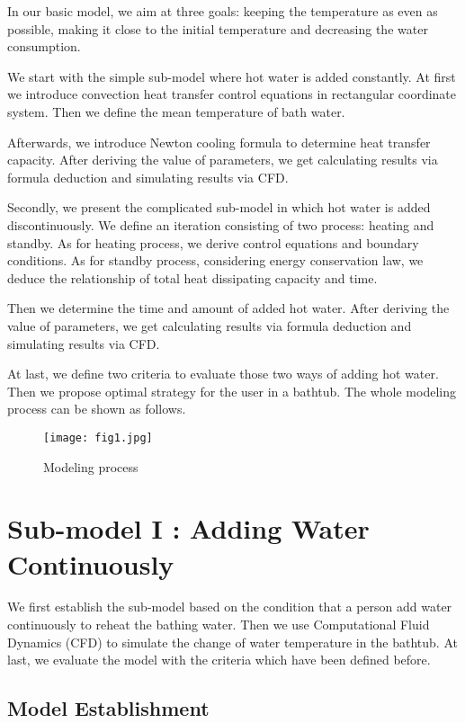 In our basic model, we aim at three goals: keeping the temperature as even as possible, making it close to the initial temperature and decreasing the water consumption.

We start with the simple sub-model where hot water is added constantly.
At first we introduce convection heat transfer control equations in rectangular coordinate system. Then we define the mean temperature of bath water.

Afterwards, we introduce Newton cooling formula to determine heat transfer
capacity. After deriving the value of parameters, we get calculating results via formula deduction and simulating results via CFD.

Secondly, we present the complicated sub-model in which hot water is
added discontinuously. We define an iteration consisting of two process:
heating and standby. As for heating process, we derive control equations and boundary conditions. As for standby process, considering energy conservation law, we deduce the relationship of total heat dissipating capacity and time.

Then we determine the time and amount of added hot water. After deriving the value of parameters, we get calculating results via formula deduction and simulating results via CFD.

At last, we define two criteria to evaluate those two ways of adding hot water. Then we propose optimal strategy for the user in a bathtub.
The whole modeling process can be shown as follows.

\begin{figure}[h]
    \centering
    \texttt{[image: fig1.jpg]}
    \caption{Modeling process} \label{fig1}
\end{figure}

\section{Sub-model I : Adding Water Continuously}

We first establish the sub-model based on the condition that a person add water continuously to reheat the bathing water. Then we use Computational Fluid Dynamics (CFD) to simulate the change of water temperature in the bathtub. At last, we evaluate the model with the criteria which have been defined before.

\subsection{Model Establishment}

